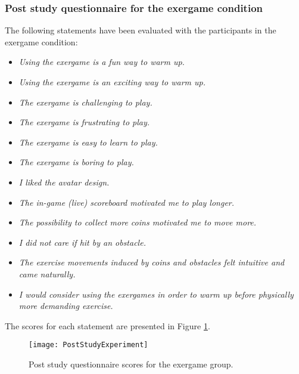 \subsubsection{Post study questionnaire for the exergame condition} 
The following statements have been evaluated with the participants in the exergame condition:
\begin{itemize}
 \item \textit{Using the exergame is a fun way to warm up.}
 \item \textit{Using the exergame is an exciting way to warm up.}
 \item \textit{The exergame is challenging to play.}
 \item \textit{The exergame is frustrating to play.}
 \item \textit{The exergame is easy to learn to play.}
 \item \textit{The exergame is boring to play.}
 \item \textit{I liked the avatar design.}
 \item \textit{The in-game (live) scoreboard motivated me to play longer.}
 \item \textit{The possibility to collect more coins motivated me to move more.}
 \item \textit{I did not care if hit by an obstacle.}
 \item \textit{The exercise movements induced by coins and obstacles felt intuitive and came naturally.} 
 \item \textit{I would consider using the exergames in order to warm up before physically more demanding exercise.}
\end{itemize}
The scores for each statement are presented in Figure \ref{fig:poststudyexperiment}.\\
\begin{figure}[h]
    \centering
    \texttt{[image: PostStudyExperiment]}
    \caption{Post study questionnaire scores for the exergame group.}
    \label{fig:poststudyexperiment}
\end{figure}\\
